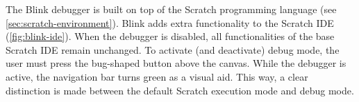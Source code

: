 \documentclass[../main]{subfiles}
\begin{document}
%


The Blink debugger is built on top of the Scratch programming language (see \cref{sec:scratch-environment}).
Blink adds extra functionality to the Scratch IDE (\cref{fig:blink-ide}).
When the debugger is disabled, all functionalities of the base Scratch IDE remain unchanged.
To activate (and deactivate) debug mode, the user must press the bug-shaped button above the canvas.
While the debugger is active, the navigation bar turns green as a visual aid.
This way, a clear distinction is made between the default Scratch execution mode and debug mode.
\end{document}
